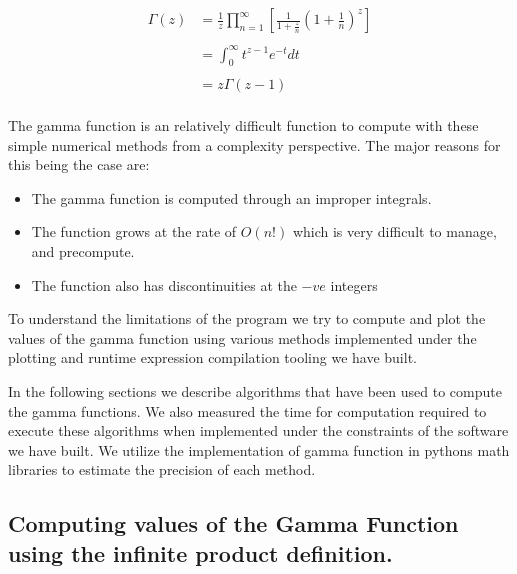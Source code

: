\documentclass[12pt]{article}
\begin{document}
\begin{align*}
	\Gamma(z) &= \frac{1}{z} \prod_{n = 1}^{\infty} \left[ \frac{1}{1 + \frac{z}{n}} \left(1 + \frac{1}{n} \right)^{z} \right]\\
	\\
	&= \int_0^\infty t^{z-1} e^{-t} dt\\
	\\
	&= z \Gamma(z - 1)
\end{align*}
\\
The gamma function is an relatively difficult function to compute with these simple numerical methods from
a complexity perspective. The major reasons for this being the case are:
\begin{itemize}
	\item The gamma function is computed through an improper integrals.
	\item The function grows at the rate of $O(n!)$ which is very difficult to manage, and precompute.
	\item The function also has discontinuities at the $-ve$ integers
\end{itemize}

To understand the limitations of the program we try to compute and plot the values of the gamma function using
various methods implemented under the plotting and runtime expression compilation tooling we have built.

In the following sections we describe algorithms that have been used to compute the gamma functions. We also
measured the time for computation required to execute these algorithms when implemented under the constraints
of the software we have built. We utilize the implementation of gamma function in pythons math libraries 
to estimate the precision of each method.

\pagebreak
\subsection{Computing values of the Gamma Function using the infinite product definition.}
\end{document}
